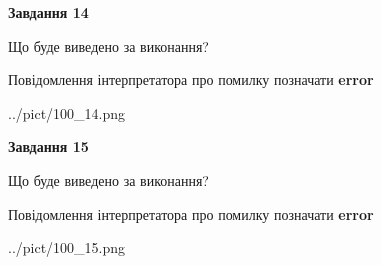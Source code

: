 \documentclass[11pt, ukrainian]{article}
\begin{document}
{\begin {large}
{\begin {center}\textbf{Завдання 14}\end {center}}\par
Що буде виведено за виконання? \par
Повідомлення інтерпретатора про помилку позначати \textbf{error}

\begin{center}
	{../pict/100_14.png}
\end{center}
\newpage

{\begin {center}\textbf{Завдання 15}\end {center}}\par
Що буде виведено за виконання? \par
Повідомлення інтерпретатора про помилку позначати \textbf{error}

\begin{center}
	{../pict/100_15.png}
\end{center}
\newpage

\end {large}}
\end{document}

